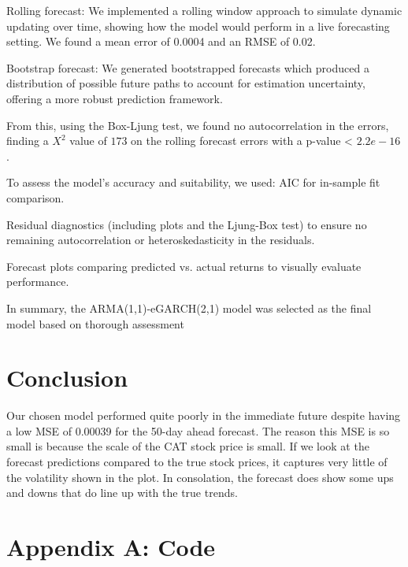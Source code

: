 \documentclass{article}
\begin{document}
Rolling forecast: We implemented a rolling window approach to simulate dynamic updating over time, showing how the model would perform in a live forecasting setting. We found a mean error of 0.0004 and an RMSE of 0.02.


Bootstrap forecast: We generated bootstrapped forecasts which produced a distribution of possible future paths to account for estimation uncertainty, offering a more robust prediction framework.

From this, using the Box-Ljung test, we found no autocorrelation in the errors, finding a $X^2$ value of $173$ on the rolling forecast errors with a p-value < $2.2e-16$. 

 To assess the model’s accuracy and suitability, we used:
AIC for in-sample fit comparison.


Residual diagnostics (including plots and the Ljung-Box test) to ensure no remaining autocorrelation or heteroskedasticity in the residuals.


Forecast plots comparing predicted vs. actual returns to visually evaluate performance.


In summary, the ARMA(1,1)-eGARCH(2,1) model was selected as the final model based on thorough assessment

\section{Conclusion}
Our chosen model performed quite poorly in the immediate future despite having a low MSE of 0.00039 for the 50-day ahead forecast.  The reason this MSE is so small is because the scale of the CAT stock price is small.  If we look at the forecast predictions compared to the true stock prices, it captures very little of the volatility shown in the plot.  In consolation, the forecast does show some ups and downs that do line up with the true trends.


\section{Appendix A: Code}
\end{document}
